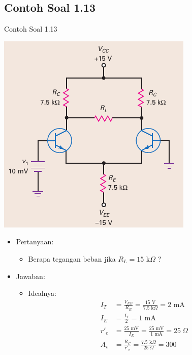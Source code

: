 \documentclass[aspectratio=169]{beamer}
\begin{document}
\subsection{Contoh Soal 1.13}
\begin{frame}{Contoh Soal 1.13}
	\begin{multicols}{2}
		\begin{center}
			\includegraphics[width=0.8\linewidth]{gambar/01.fig32}
		\end{center}
		\columnbreak
		\begin{itemize}
			\item Pertanyaan:
			\begin{itemize}
				\item Berapa tegangan beban jika $ R_L = 15 \text{ k}\Omega $ ?
			\end{itemize}
			\item Jawaban:
			\begin{itemize}
				\item Idealnya:
				\begin{align*}
					I_T &= \frac{V_{EE}}{R_E} = \frac{15 \text{ V}}{7.5 \text{ k}\Omega} = 2 \text{ mA} \\
					I_E &= \frac{I_T}{2} = 1 \text{ mA} \\
					r'_e &= \frac{25 \text{ mV}}{I_E} = \frac{25 \text{ mV}}{1 \text{ mA}} = 25~\Omega \\
					A_v &= \frac{R_C}{r'_e} = \frac{7.5 \text{ k}\Omega}{25~\Omega} = 300
				\end{align*}
			\end{itemize}
		\end{itemize}
	\end{multicols}
\end{frame}
\end{document}
